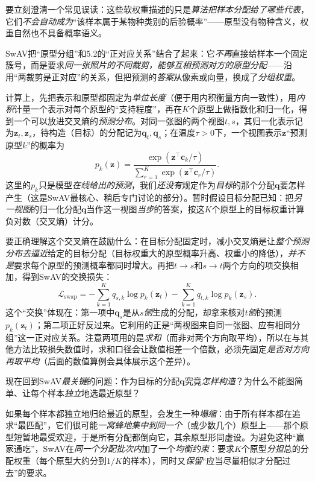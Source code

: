 要立刻澄清一个常见误读：这些软权重描述的只是\emph{算法把样本分配给了哪些代表}，它们\emph{不会自动成为}“该样本属于某物种类别的后验概率”——原型没有物种含义，权重自然也不具备概率语义。

SwAV把“原型分组”和5.2的“正对应关系”结合了起来：它\emph{不再}直接给样本一个固定簇号，而是要求\emph{同一张照片的不同裁剪，能够互相预测对方的原型分配}——沿用“两裁剪是正对应”的关系，但把预测的\emph{答案}从像素或向量，换成了\emph{分组权重}。

计算上，先把表示和原型都固定为\emph{单位长度}（便于用内积衡量方向一致性），用\emph{内积}计量一个表示对每个原型的“支持程度”，再在$K$个原型上做指数化和归一化，得到一个可以放进交叉熵的\emph{预测分布}。对同一张图的两个视图$t,s$，其归一化表示记为$\bm{z}_t,\bm{z}_s$，待构造（目标）的分配记为$\bm{q}_t,\bm{q}_s$；在温度$\tau>0$下，一个视图表示$\bm{z}$“预测原型$k$”的概率为
\[
  p_k(\bm{z})
  =\frac{\exp(\bm{z}^{\top}\bm{c}_k/\tau)}
  {\sum_{r=1}^{K}\exp(\bm{z}^{\top}\bm{c}_r/\tau)}.
\]
这里的$p_k$只是模型\emph{在线给出的预测}，我们\emph{还没有}规定作为\emph{目标}的那个分配$\bm{q}$要怎样产生（这是SwAV最核心、稍后专门讨论的部分）。暂时假设目标分配已知：把\emph{另一视图}的归一化分配$\bm{q}$当作这一视图\emph{当步}的答案，按这$K$个原型上的目标权重计算负对数（交叉熵）计分。

要正确理解这个交叉熵在鼓励什么：在目标分配固定时，减小交叉熵是让\emph{整个预测分布去逼近}给定的目标分配（目标权重大的原型概率升高、权重小的降低），\emph{并不是}要求每个原型的预测概率都同时增大。再把$t\to s$和$s\to t$两个方向的项交换相加，得到SwAV的交换损失：
\begin{equation}
  \mathcal{L}_{\mathrm{swap}}
  =-\sum_{k=1}^{K}q_{s,k}\log p_k(\bm{z}_t)
   -\sum_{k=1}^{K}q_{t,k}\log p_k(\bm{z}_s).
  \label{eq:data-derived-knowledge-swav-swap}
\end{equation}
这个“交换”体现在：第一项中$\bm{q}_s$是从\emph{$s$侧}生成的分配，却拿来核对\emph{$t$侧}的预测$p_k(\bm{z}_t)$；第二项正好反过来。它利用的正是“两视图来自同一张图、应有相同分组”这一正对应关系。注意两项用的是\emph{求和}（而非对两个方向取平均），所以在与其他方法比较损失数值时，求和口径会让数值相差一个倍数，必须先固定\emph{是否对方向再取平均}（后面的数值算例会具体展示这个差异）。

现在回到SwAV\emph{最关键}的问题：作为目标的分配$\bm{q}$究竟\emph{怎样构造}？为什么不能图简单、让每个样本\emph{独立}地选最近原型？

如果每个样本都独立地归给最近的原型，会发生一种\emph{塌缩}：由于所有样本都在追求“最匹配”，它们很可能\emph{一窝蜂地集中到同一个}（或少数几个）原型上——那个原型短暂地最受欢迎，于是所有分配都倒向它，其余原型形同虚设。为避免这种“赢家通吃”，SwAV在\emph{同一个分配批次内}加了一个\emph{均衡约束}：要求$K$个原型\emph{分担}总的分配权重（每个原型大约分到$1/K$的样本），同时又\emph{保留}“应当尽量相似才分配过去”的要求。

